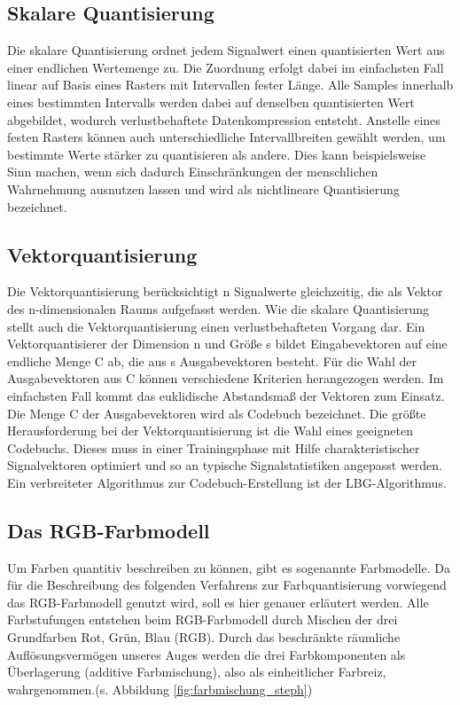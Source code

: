 \subsection{\textbf{Skalare Quantisierung}}
Die skalare Quantisierung ordnet jedem Signalwert einen quantisierten Wert aus einer endlichen Wertemenge zu. Die Zuordnung erfolgt dabei im einfachsten Fall linear auf Basis eines Rasters mit Intervallen fester Länge. Alle Samples innerhalb eines bestimmten Intervalls werden dabei auf denselben quantisierten Wert abgebildet, wodurch verlustbehaftete Datenkompression entsteht. Anstelle eines festen Rasters können auch unterschiedliche Intervallbreiten gewählt werden, um bestimmte Werte stärker zu quantisieren als andere. Dies kann beispielsweise Sinn machen, wenn sich dadurch Einschränkungen der menschlichen Wahrnehmung ausnutzen lassen und wird als nichtlineare Quantisierung bezeichnet. 

\subsection{\textbf{Vektorquantisierung}}
Die Vektorquantisierung berücksichtigt n Signalwerte gleichzeitig, die als Vektor des n-dimensionalen Raums aufgefasst werden. Wie die skalare Quantisierung stellt auch die Vektorquantisierung einen verlustbehafteten Vorgang dar. Ein Vektorquantisierer der Dimension n und Größe s bildet Eingabevektoren auf eine endliche Menge C ab, die aus s Ausgabevektoren besteht. Für die Wahl der Ausgabevektoren aus C können verschiedene Kriterien herangezogen werden. Im einfachsten Fall kommt das euklidische Abstandsmaß der Vektoren zum Einsatz. Die Menge C der Ausgabevektoren wird als Codebuch bezeichnet. Die größte Herausforderung bei der Vektorquantisierung ist die Wahl eines geeigneten Codebuchs. Dieses muss in einer Trainingsphase mit Hilfe charakteristischer Signalvektoren optimiert und so an typische Signalstatistiken angepasst werden. Ein verbreiteter Algorithmus zur Codebuch-Erstellung ist der LBG-Algorithmus.

\subsection{\textbf{Das RGB-Farbmodell}}
Um Farben quantitiv beschreiben zu können, gibt es sogenannte Farbmodelle. Da für die Beschreibung des folgenden Verfahrens zur Farbquantisierung vorwiegend das RGB-Farbmodell genutzt wird, soll es hier genauer erläutert werden. Alle Farbstufungen entstehen beim RGB-Farbmodell durch Mischen der drei Grundfarben Rot, Grün, Blau (RGB). Durch das beschränkte räumliche Auflösungsvermögen unseres Auges werden die drei Farbkomponenten als Überlagerung (additive Farbmischung), also als einheitlicher Farbreiz, wahrgenommen.(s. Abbildung \ref{fig:farbmischung_steph})

